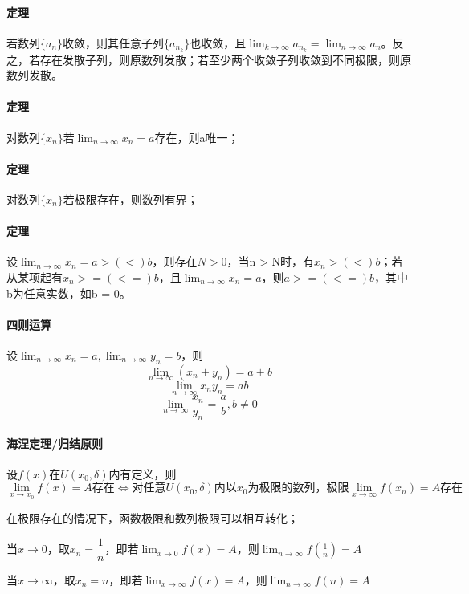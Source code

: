 \paragraph{定理}
若数列\(\{a_n\}\)收敛，则其任意子列\(\{a_{n_k}\}\)也收敛，且\(\displaystyle \lim_{k \to \infty}a_{n_k} = \lim_{n \to \infty}a_n\)。反之，若存在发散子列，则原数列发散；若至少两个收敛子列收敛到不同极限，则原数列发散。

\paragraph{定理}
对数列\(\{x_n\}\)若\(\displaystyle \lim_{n \to \infty}x_n = a\)存在，则a唯一；

\paragraph{定理}
对数列\(\{x_n\}\)若极限存在，则数列有界；

\paragraph{定理}
设\(\displaystyle \lim_{n \to \infty}x_n = a >(<) b\)，则存在\(N > 0\)，当n > N时，有\(x_n >(<) b\)；若从某项起有\(x_n >=(<=) b\)，且\(\lim_{n \to \infty}x_n = a\)，则\(a >=(<=) b\)，其中b为任意实数，如b = 0。


\paragraph{四则运算}
设\(\displaystyle \lim_{n \to \infty}x_n = a, \lim_{n \to \infty}y_n = b\)，则
\[\lim_{n \to \infty}(x_n \pm y_n) = a \pm b\]
\[\lim_{n \to \infty}x_ny_n = ab\]
\[\lim_{n \to \infty}\dfrac{x_n}{y_n} = \dfrac{a}{b},b \neq 0\]


\paragraph{海涅定理/归结原则}
设\(f(x)\)在\(U(x_0, \delta)\)内有定义，则
\[\displaystyle \lim_{x \to x_0}f(x) = A\text{存在} \Leftrightarrow \text{对任意}U(x_0, \delta)\text{内以}x_0\text{为极限的数列，极限}\lim_{x \to \infty}f(x_n) = A\text{存在}\]

在极限存在的情况下，函数极限和数列极限可以相互转化；

当\(x \to 0\)，取\(x_n = \dfrac{1}{n}\)，即若\(\displaystyle \lim_{x \to 0}f(x) = A\)，则\(\displaystyle \lim_{n \to \infty}f(\frac{1}{n}) = A\)

当\(x \to \infty\)，取\(x_n = n\)，即若\(\displaystyle \lim_{x \to \infty}f(x) = A\)，则\(\displaystyle \lim_{n \to \infty}f(n) = A\)

